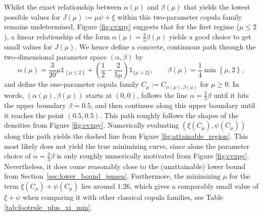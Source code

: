 \documentclass{article}
\newcommand{\1}{\mathds{1}}
\begin{document}
Whilst the exact relationship between $\alpha(\mu)$ and $\beta(\mu)$ that yields the lowest possible values for $J(\mu):=\mu\psi +\xi$ within this two-parameter copula family remains undetermined, Figure \ref{fig:cvxpy} suggests that for the first regime ($\mu \le 2$), a linear relationship of the form $\alpha(\mu) = \frac35\beta(\mu)$ yields a good choice to get small values for $J(\mu)$.
We hence define a concrete, continuous path through the two-dimensional parameter space $(\alpha, \beta)$ by
\begin{equation}\label{eq:dashed_line_copula_family}
\alpha(\mu)= \frac3{20}\mu \1_{\left\{\mu \le 2\right\}} + \left(\frac12 - \frac{2}{5\mu}\right) \1_{\{\mu > 2\}}, 
\qquad \beta(\mu)= \frac14\min\left\{\mu, 2\right\},
\end{equation}
and define the one-parameter copula family
\(
C_\mu := C_{\alpha(\mu), \beta(\mu)}
\)
for $\mu\ge 0$.
In words, $(\alpha(\mu), \beta(\mu))$ starts at $(0,0)$, follows the line $\alpha = \frac35 \beta$ until it hits the upper boundary $\beta = 0.5$, and then continues along this upper boundary until it reaches the point $(0.5, 0.5)$.
This path roughly follows the shapes of the densities from Figure \ref{fig:cvxpy}.
Numerically evaluating $(\xi(C_\mu),\psi(C_\mu))$ along this path yields the dashed line from Figure \ref{fig:attainable_region}.
This most likely does not yield the true minimizing curve, since alone the parameter choice of $\alpha=\frac{3}{5}\beta$ is only roughly numerically motivated from Figure \ref{fig:cvxpy}.
Nevertheless, it does come reasonably close to the (unattainable) lower bound from Section~\ref{sec:lower_bound_jensen}.
Furthermore, the minimizing $\mu$ for the term $\xi(C_\mu) + \psi(C_\mu)$ lies around $1.26$, which gives a comparably small value of $\xi+\psi$ when comparing it with other classical copula families, see Table \ref{tab:footrule_plus_xi_min}.
\end{document}
